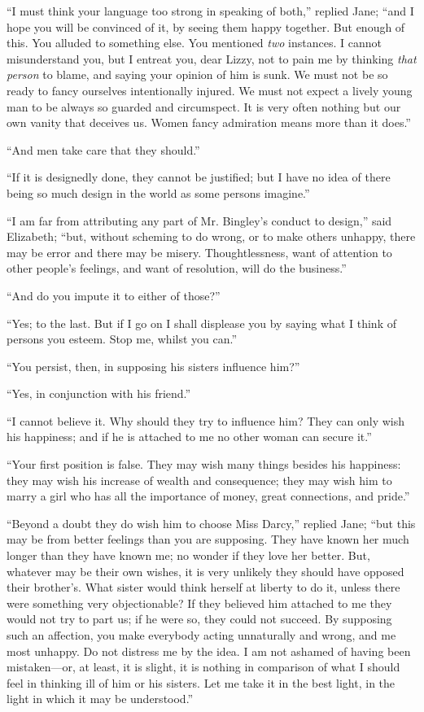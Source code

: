 \documentclass[12pt,openright]{book}
\begin{document}
“I must think your language too strong in speaking of both,” replied Jane; “and I hope you will be convinced of it, by seeing them happy together. But enough of this. You alluded to something else. You mentioned \textit{two} instances. I cannot misunderstand you, but I entreat you, dear Lizzy, not to pain me by thinking \textit{that person} to blame, and saying your opinion of him is sunk. We must not be so ready to fancy ourselves intentionally injured. We must not expect a lively young man to be always so guarded and circumspect. It is very often nothing but our own vanity that deceives us. Women fancy admiration means more than it does.”

“And men take care that they should.”

“If it is designedly done, they cannot be justified; but I have no idea of there being so much design in the world as some persons imagine.”

“I am far from attributing any part of Mr. Bingley’s conduct to design,” said Elizabeth; “but, without scheming to do wrong, or to make others unhappy, there may be error and there may be misery. Thoughtlessness, want of attention to other people’s feelings, and want of resolution, will do the business.”

“And do you impute it to either of those?”

“Yes; to the last. But if I go on I shall displease you by saying what I think of persons you esteem. Stop me, whilst you can.”

“You persist, then, in supposing his sisters influence him?”

“Yes, in conjunction with his friend.”

“I cannot believe it. Why should they try to influence him? They can only wish his happiness; and if he is attached to me no other woman can secure it.”

“Your first position is false. They may wish many things besides his happiness: they may wish his increase of wealth and consequence; they may wish him to marry a girl who has all the importance of money, great connections, and pride.”

“Beyond a doubt they do wish him to choose Miss Darcy,” replied Jane; “but this may be from better feelings than you are supposing. They have known her much longer than they have known me; no wonder if they love her better. But, whatever may be their own wishes, it is very unlikely they should have opposed their brother’s. What sister would think herself at liberty to do it, unless there were something very objectionable? If they believed him attached to me they would not try to part us; if he were so, they could not succeed. By supposing such an affection, you make everybody acting unnaturally and wrong, and me most unhappy. Do not distress me by the idea. I am not ashamed of having been mistaken—or, at least, it is slight, it is nothing in comparison of what I should feel in thinking ill of him or his sisters. Let me take it in the best light, in the light in which it may be understood.”
\end{document}
